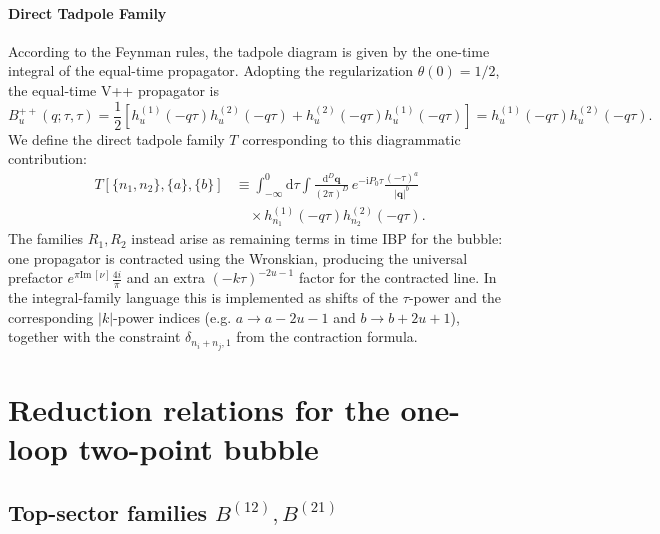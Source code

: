 \documentclass[a4paper,12pt]{article}
\newcommand{\FR}[2]{\displaystyle\frac{\,{#1}\,}{#2}}
\def\di{{\mathrm{d}}}
\def\mb{\mathbf}
\def\ii{\mathrm{i}}
\def\to{\rightarrow}
\def\Im{\mathrm{Im}\,}
\begin{document}
\paragraph{Direct Tadpole Family}
According to the Feynman rules, the tadpole diagram is given by the one-time integral of the equal-time propagator. Adopting the regularization $\theta(0)=1/2$, the equal-time V++ propagator is
\begin{equation}
B^{++}_
u(q;\tau,\tau) = \frac{1}{2}\left[h^{(1)}_
u(-q\tau)h^{(2)}_
u(-q\tau) + h^{(2)}_
u(-q\tau)h^{(1)}_
u(-q\tau)\right] = h^{(1)}_
u(-q\tau)h^{(2)}_
u(-q\tau).
\end{equation}
We define the direct tadpole family $T$ corresponding to this diagrammatic contribution:
\begin{align}
	T[\{n_1,n_2\},\{a\},\{b\}] & \equiv \int_{-\infty}^0 \di\tau \int \FR{\di^D \mb q}{(2\pi)^D}\, e^{-\ii P_0\tau} \frac{(-\tau)^{a}}{|\mb q|^{b}} \nonumber \\
	                                        & \quad\times h_{n_1}^{(1)}(-q\tau)h_{n_2}^{(2)}(-q\tau).
\end{align}
The families $R_1,R_2$ instead arise as remaining terms in time IBP for the bubble: one propagator is contracted using the Wronskian, producing the universal prefactor $e^{\pi \Im [\nu]}\frac{4i}{\pi}$ and an extra $(-k\tau)^{-2
u-1}$ factor for the contracted line. In the integral-family language this is implemented as shifts of the $\tau$-power and the corresponding $|k|$-power indices (e.g. $a\to a-2
u-1$ and $b\to b+2
u+1$), together with the constraint $\delta_{n_i+n_j,1}$ from the contraction formula.

\section{Reduction relations for the one-loop two-point bubble}
\label{sec:reductions}
\subsection{Top-sector families \texorpdfstring{$B^{(12)},B^{(21)}$}{B(12), B(21)}}
\end{document}
